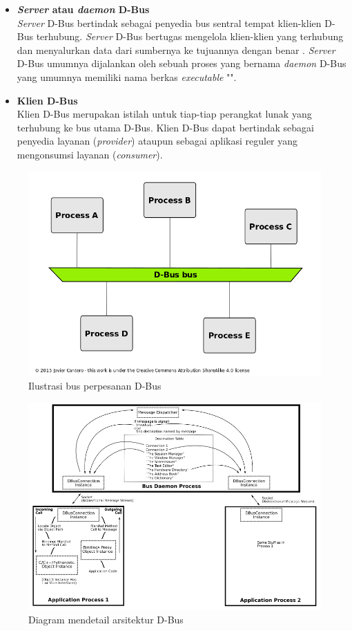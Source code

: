 \begin{itemize}
    \item \textbf{\textit{Server} atau \textit{daemon} D-Bus}\\
    \textit{Server} D-Bus bertindak sebagai penyedia bus sentral tempat klien-klien D-Bus terhubung. \textit{Server} D-Bus bertugas mengelola klien-klien yang terhubung dan menyalurkan data dari sumbernya ke tujuannya dengan benar \cite{qt-introduction-to-dbus}. \textit{Server} D-Bus umumnya dijalankan oleh sebuah proses yang bernama \textit{daemon} D-Bus yang umumnya memiliki nama berkas \textit{executable} "".

    \item \textbf{Klien D-Bus}\\
    Klien D-Bus merupakan istilah untuk tiap-tiap perangkat lunak yang terhubung ke bus utama D-Bus. Klien D-Bus dapat bertindak sebagai penyedia layanan (\textit{provider}) ataupun sebagai aplikasi reguler yang mengonsumsi layanan (\textit{consumer}).
\end{itemize}

\begin{figure}
    \centering
    \includegraphics[width=0.75\linewidth]{assets/dbus-analogy-diagram.png}
    \caption{Ilustrasi bus perpesanan D-Bus \cite{dbus-bus-illustration}}
    \label{fig:enter-label}
\end{figure}

\begin{figure}
    \centering
    \includegraphics[width=1\linewidth]{assets/dbus-diagram.png}
    \caption{Diagram mendetail arsitektur D-Bus \cite{dbus-main-project-page}}
    \label{fig:enter-label}
\end{figure}

